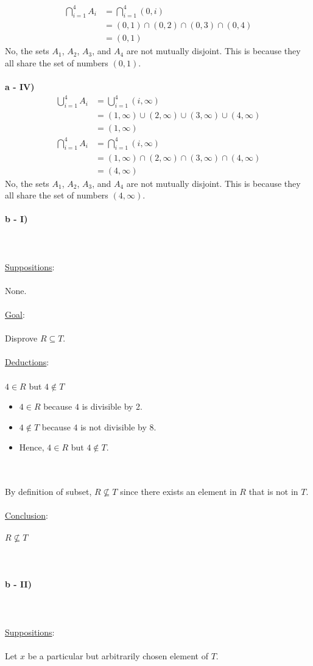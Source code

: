 \documentclass[12pt]{article}
\newcommand{\xlist}[1]{
    \begin{itemize}
        \renewcommand{\labelitemi}{$\centerdot$}
        #1
    \end{itemize}
    \newblock
    \\ \\
}
\newcommand{\xsupposition}[1]{
    \underline{Suppositions}:
    \\ \\
    #1
    \\ \\
}
\newcommand{\xgoal}[1]{
    \underline{Goal}:
    \\ \\
    #1
    \\ \\
}
\newcommand{\xdeductions}{
    \underline{Deductions}:
    \\ \\
}
\newcommand{\xconclusion}[1]{
    \underline{Conclusion}:
    \\ \\
    #1
    \\ \\
}
\begin{document}
\begin{align*}
  \bigcap_{i=1}^{4}A_i &= \bigcap_{i=1}^{4}(0, i) \\
  &= (0, 1) \cap (0, 2) \cap (0, 3) \cap (0, 4) \\
  &= (0, 1)
\end{align*}
No, the sets $A_1$, $A_2$, $A_3$, and $A_4$ are not mutually disjoint. This is because they all share the set of numbers $(0, 1)$.
\\ \\
\textbf{a - IV)}
\begin{align*}
  \bigcup_{i=1}^{4}A_i &= \bigcup_{i=1}^{4}(i, \infty) \\
  &= (1, \infty) \cup (2, \infty) \cup (3, \infty) \cup (4, \infty) \\
  &= (1, \infty)
\end{align*}
\begin{align*}
  \bigcap_{i=1}^{4}A_i &= \bigcap_{i=1}^{4}(i, \infty) \\
  &= (1, \infty) \cap (2, \infty) \cap (3, \infty) \cap (4, \infty) \\
  &= (4, \infty)
\end{align*}
No, the sets $A_1$, $A_2$, $A_3$, and $A_4$ are not mutually disjoint. This is because they all share the set of numbers $(4, \infty)$.
\\ \\
\textbf{b - I)} \\ \\
\\ \\
\xsupposition{None.}
\xgoal{Disprove $R \subseteq T$.}
\xdeductions
$4 \in R$ but $4 \not\in T$
\xlist{
  \item $4 \in R$ because $4$ is divisible by 2.
  \item $4 \not\in T$ because $4$ is not divisible by 8.
  \item Hence, $4 \in R$ but $4 \not\in T$.
}
By definition of subset, $R \not\subseteq T$ since there exists an element in $R$ that is not in $T$.
\\ \\
\xconclusion{$R \not\subseteq T$}
\\ \\
\textbf{b - II)} \\ \\
\\ \\
\xsupposition{Let $x$ be a particular but arbitrarily chosen element of $T$.}
\end{document}
